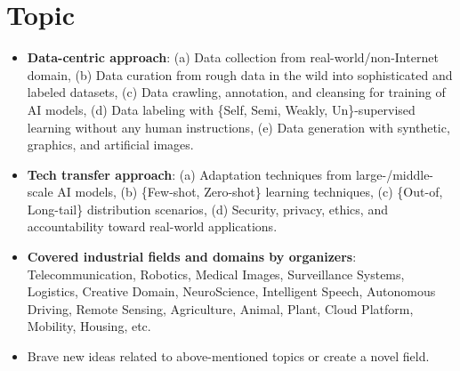 \documentclass{article}
\newcommand\conf{ICCV 2025\xspace}
\def\c#1{\textcolor{gray}{#1}}
\begin{document}
\section{Topic}
\begin{itemize}
    \item {\bf Data-centric approach}: (a) Data collection from real-world/non-Internet domain, (b) Data curation from rough data in the wild into sophisticated and labeled datasets, (c) Data crawling, annotation, and cleansing for training of AI models, (d) Data labeling with \{Self, Semi, Weakly, Un\}-supervised learning without any human instructions, (e) Data generation with synthetic, graphics, and artificial images.

    \item {\bf Tech transfer approach}: (a) Adaptation techniques from large-/middle-scale AI models, (b) \{Few-shot, Zero-shot\} learning techniques, (c) \{Out-of, Long-tail\} distribution scenarios, (d) Security, privacy, ethics, and accountability toward real-world applications.

    \item {\bf Covered industrial fields and domains by organizers}: Telecommunication, Robotics, Medical Images, Surveillance Systems, Logistics, Creative Domain, NeuroScience, Intelligent Speech, Autonomous Driving, Remote Sensing, Agriculture, Animal, Plant, Cloud Platform, Mobility, Housing, etc.
    \item Brave new ideas related to above-mentioned topics or create a novel field.

\end{itemize}
\end{document}
